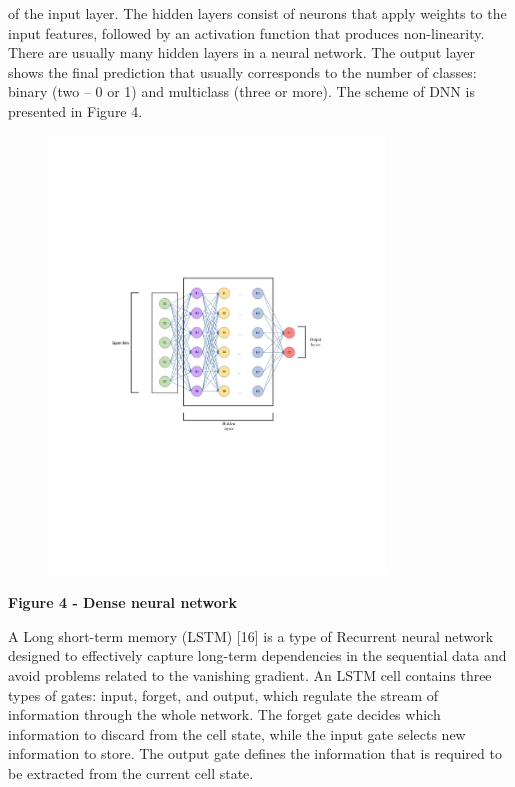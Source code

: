 of the input layer. The hidden layers consist of neurons that apply
weights to the input features, followed by an activation function that
produces non-linearity. There are usually many hidden layers in a neural
network. The output layer shows the final prediction that usually
corresponds to the number of classes: binary (two -- 0 or 1) and
multiclass (three or more). The scheme of DNN is presented in Figure 4.

\begin{figure}[H]
	\centering
	\includegraphics[width=0.8\textwidth]{media/ict/image44}
	\caption*{}
\end{figure}


{\bfseries Figure 4 - Dense neural network}

A Long short-term memory (LSTM) {[}16{]} is a type of Recurrent neural
network designed to effectively capture long-term dependencies in the
sequential data and avoid problems related to the vanishing gradient. An
LSTM cell contains three types of gates: input, forget, and output,
which regulate the stream of information through the whole network. The
forget gate decides which information to discard from the cell state,
while the input gate selects new information to store. The output gate
defines the information that is required to be extracted from the
current cell state.

